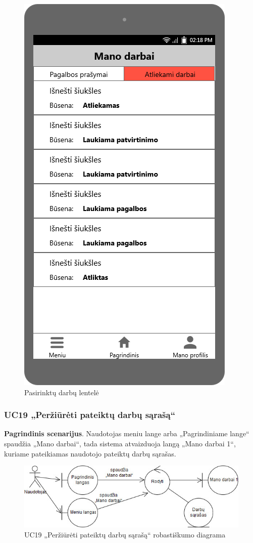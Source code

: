 \documentclass{VUMIFPSbakalaurinis}
\begin{document}
\begin{figure}[H]
	\centering
	\includegraphics[scale=0.4]{img/ScreenShots/05-Mano-darbai1}
	\caption{Pasirinktų darbų lentelė}
	\label{img:requested jobs table}
\end{figure}
\subsubsection{UC19 „Peržiūrėti pateiktų darbų sąrašą“}
\textbf{Pagrindinis scenarijus}. Naudotojas meniu lange arba „Pagrindiniame lange“ spaudžia „Mano darbai“, tada sistema atvaizduoja langą „Mano darbai 1“, kuriame pateikiamas naudotojo pateiktų darbų sąrašas.

\begin{figure}[H]
	\centering
	\includegraphics[scale=0.6]{img/Robustness/UC19}
	\caption{UC19 „Peržiūrėti pateiktų darbų sąrašą“ robastiškumo diagrama}
	\label{img:uc19rob}
\end{figure}
\end{document}
